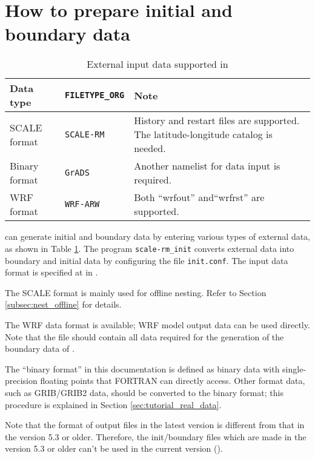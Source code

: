 \section{How to prepare initial and boundary data} \label{sec:adv_datainput}

\begin{table}[tbh]
\begin{center}
\caption{External input data supported in \scalelib}
\begin{tabularx}{150mm}{l|l|X} \hline
 \rowcolor[gray]{0.9} Data type   & \verb|FILETYPE_ORG|  & Note \\ \hline
 SCALE format   & \verb|SCALE-RM|     & History and restart files are supported. The latitude-longitude catalog is needed. \\ \hline
 Binary format  & \verb|GrADS|        & Another namelist for data input is required.    \\ \hline
 WRF format     & \verb|WRF-ARW|      & Both ``wrfout''  and``wrfrst'' are supported.\\ \hline
\end{tabularx}
\label{tab:inputdata_format}
\end{center}
\end{table}

\scalerm can generate initial and boundary data by entering various types of external data, as shown in Table \ref{tab:inputdata_format}.
The program \verb|scale-rm_init| converts external data into boundary and initial data by configuring the file \verb|init.conf|.
The input data format is specified at  in .

The SCALE format is mainly used for offline nesting.
Refer to Section \ref{subsec:nest_offline} for details.

The WRF data format is available; WRF model output data can be used directly.
Note that the file should contain all data required for the generation of the boundary data of \scalerm.

The ``binary format'' in this documentation is defined as binary data with single-precision floating points that FORTRAN can directly access.
Other format data, such as GRIB/GRIB2 data, should be converted to the binary format; this procedure is explained in Section \ref{sec:tutorial_real_data}.

Note that the format of output files in the latest version is different from that in the version 5.3 or older.
Therefore, the init/boundary files which are made in the version 5.3 or older can't be used in the current version (\scalelib \version).

